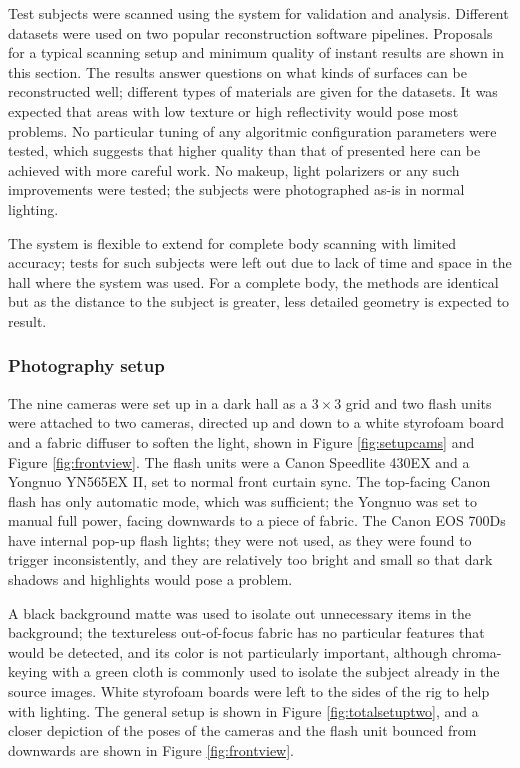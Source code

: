 Test subjects were scanned using the system for validation and analysis.
Different datasets were used on two popular reconstruction software pipelines.
Proposals for a typical scanning setup and minimum quality of instant results are shown in this section.
The results answer questions on what kinds of surfaces can be reconstructed well; different types of materials are given for the datasets.
It was expected that areas with low texture or high reflectivity would pose most problems.
No particular tuning of any algoritmic configuration parameters were tested, which suggests that higher quality than that of presented here can be achieved with more careful work.
No makeup, light polarizers or any such improvements were tested; the subjects were photographed as-is in normal lighting.

The system is flexible to extend for complete body scanning with limited accuracy; tests for such subjects were left out due to lack of time and space in the hall where the system was used.
For a complete body, the methods are identical but as the distance to the subject is greater, less detailed geometry is expected to result.

\subsubsection{Photography setup}

The nine cameras were set up in a dark hall as a $3 \times 3$ grid and two flash units were attached to two cameras, directed up and down to a white styrofoam board and a fabric diffuser to soften the light, shown in Figure \ref{fig:setupcams} and Figure \ref{fig:frontview}.
The flash units were a Canon Speedlite 430EX and a Yongnuo YN565EX II, set to normal front curtain sync.
The top-facing Canon flash has only automatic mode, which was sufficient; the Yongnuo was set to manual full power, facing downwards to a piece of fabric.
The Canon EOS 700Ds have internal pop-up flash lights; they were not used, as they were found to trigger inconsistently, and they are relatively too bright and small so that dark shadows and highlights would pose a problem.

A black background matte was used to isolate out unnecessary items in the background;
the textureless out-of-focus fabric has no particular features that would be detected, and its color is not particularly important, although chroma-keying with a green cloth is commonly used to isolate the subject already in the source images.
White styrofoam boards were left to the sides of the rig to help with lighting.
The general setup is shown in Figure \ref{fig:totalsetuptwo}, and a closer depiction of the poses of the cameras and the flash unit bounced from downwards are shown in Figure \ref{fig:frontview}.

